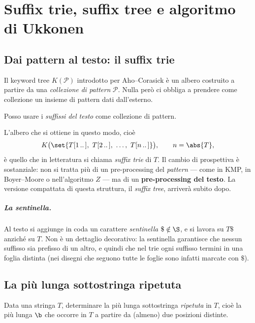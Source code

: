 \chapter{Suffix trie, suffix tree e algoritmo di Ukkonen}

\section{Dai pattern al testo: il suffix trie}

Il keyword tree $K(\mathcal{P})$ introdotto per Aho--Corasick è un albero costruito a
partire da una \emph{collezione di pattern} $\mathcal{P}$. Nulla però ci obbliga a prendere
come collezione un insieme di pattern dati dall'esterno.

\begin{osservazione}
Posso usare i \emph{suffissi del testo} come collezione di pattern.
\end{osservazione}

L'albero che si ottiene in questo modo, cioè
\[
  K\bigl(\set{\suf{T}{1},\ \suf{T}{2},\ \dots,\ \suf{T}{n}}\bigr),
  \qquad n = \abs{T},
\]
è quello che in letteratura si chiama \emph{suffix trie} di $T$. Il cambio di prospettiva è
sostanziale: non si tratta più di un pre-processing del \emph{pattern} --- come in KMP, in
Boyer--Moore o nell'algoritmo $Z$ --- ma di un \textbf{pre-processing del testo}. La versione
compattata di questa struttura, il \emph{suffix tree}, arriverà subito dopo.

\paragraph{La sentinella.}
Al testo si aggiunge in coda un carattere \emph{sentinella} $\$ \notin \S$, e si lavora su
$T\$$ anziché su $T$. Non è un dettaglio decorativo: la sentinella garantisce che nessun
suffisso sia prefisso di un altro, e quindi che nel trie ogni suffisso termini in una foglia
distinta (nei disegni che seguono tutte le foglie sono infatti marcate con $\$$).

\section{La più lunga sottostringa ripetuta}

\begin{domanda}
Data una stringa $T$, determinare la più lunga sottostringa \emph{ripetuta} in $T$, cioè la
più lunga $\b$ che occorre in $T$ a partire da (almeno) due posizioni distinte.
\end{domanda}

